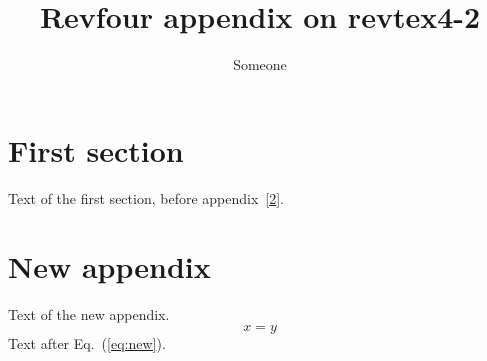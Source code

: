 \documentclass{revtex4-2}
\begin{document}
\title{Revfour appendix on revtex4-2}
\author{Someone}
\maketitle
\section{First section}
Text of the first section, before appendix~[\ref{app:new}].
\appendix*
\section{New appendix}\label{app:new}
Text of the new appendix.
\begin{equation}
x = y \label{eq:new}
\end{equation}
Text after Eq.~(\ref{eq:new}).
\end{document}
